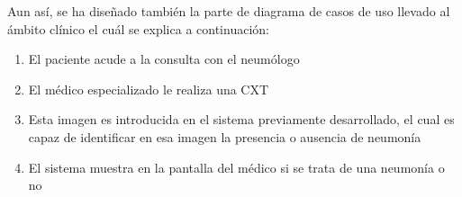 Aun así, se ha diseñado también la parte de diagrama de casos de uso llevado al ámbito clínico el cuál se explica a continuación:

\begin{enumerate}
    \item El paciente acude a la consulta con el neumólogo
    \item El médico especializado le realiza una CXT 
    \item Esta imagen es introducida en el sistema previamente desarrollado, el cual es capaz de identificar en esa imagen la presencia o ausencia de neumonía
    \item El sistema muestra en la pantalla del médico si se trata de una neumonía o no
\end{enumerate}



